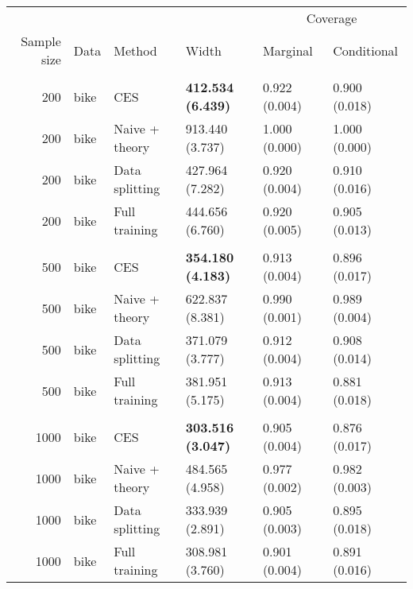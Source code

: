 
\begin{tabular}{rlllll}
\toprule
\multicolumn{4}{c}{ } & \multicolumn{2}{c}{Coverage} \\
\cmidrule(l{3pt}r{3pt}){5-6}
Sample size & Data & Method & Width & Marginal & Conditional\\
\midrule
\addlinespace[0.3em]
\multicolumn{6}{l}{\textbf{200}}\\
\hspace{1em}200 & bike & CES & \textbf{412.534 (6.439)} & 0.922 (0.004) & 0.900 (0.018)\\
\hspace{1em}200 & bike & Naive + theory & 913.440 (3.737) & 1.000 (0.000) & 1.000 (0.000)\\
\hspace{1em}200 & bike & Data splitting & 427.964 (7.282) & 0.920 (0.004) & 0.910 (0.016)\\
\hspace{1em}200 & bike & Full training & 444.656 (6.760) & 0.920 (0.005) & 0.905 (0.013)\\
\addlinespace[0.3em]
\multicolumn{6}{l}{\textbf{500}}\\
\hspace{1em}500 & bike & CES & \textbf{354.180 (4.183)} & 0.913 (0.004) & 0.896 (0.017)\\
\hspace{1em}500 & bike & Naive + theory & 622.837 (8.381) & 0.990 (0.001) & 0.989 (0.004)\\
\hspace{1em}500 & bike & Data splitting & 371.079 (3.777) & 0.912 (0.004) & 0.908 (0.014)\\
\hspace{1em}500 & bike & Full training & 381.951 (5.175) & 0.913 (0.004) & 0.881 (0.018)\\
\addlinespace[0.3em]
\multicolumn{6}{l}{\textbf{1000}}\\
\hspace{1em}1000 & bike & CES & \textbf{303.516 (3.047)} & 0.905 (0.004) & 0.876 (0.017)\\
\hspace{1em}1000 & bike & Naive + theory & 484.565 (4.958) & 0.977 (0.002) & 0.982 (0.003)\\
\hspace{1em}1000 & bike & Data splitting & 333.939 (2.891) & 0.905 (0.003) & 0.895 (0.018)\\
\hspace{1em}1000 & bike & Full training & 308.981 (3.760) & 0.901 (0.004) & 0.891 (0.016)\\

\end{tabular}
